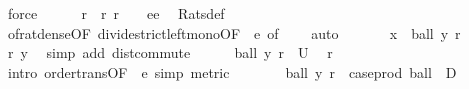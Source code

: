 \begin{isabellebody}
\ force\isanewline
\ \ \ \ \isamarkupfalse%
\ r\ \ r{\isacharcolon}{\kern0pt}\ {\isachardoublequoteopen}r\ {\isasymin}\ {\isasymrat}\ {\isasyminter}\ {\isacharbraceleft}{\kern0pt}e{\isacharslash}{\kern0pt}{}{\isacharless}{\kern0pt}{\isachardot}{\kern0pt}{\isachardot}{\kern0pt}{\isacharless}{\kern0pt}e{\isacharslash}{\kern0pt}{}{\isacharbraceright}{\kern0pt}{\isachardoublequoteclose}\ \isamarkupfalse%
\ Rats{\isacharunderscore}{\kern0pt}def\ \isamarkupfalse%
\ of{\isacharunderscore}{\kern0pt}rat{\isacharunderscore}{\kern0pt}dense{\isacharbrackleft}{\kern0pt}OF\ divide{\isacharunderscore}{\kern0pt}strict{\isacharunderscore}{\kern0pt}left{\isacharunderscore}{\kern0pt}mono{\isacharbrackleft}{\kern0pt}OF\ {\isacharunderscore}{\kern0pt}\ e{\isacharparenleft}{\kern0pt}{}{\isacharparenright}{\kern0pt}{\isacharbrackright}{\kern0pt}{\isacharcomma}{\kern0pt}\ of\ {}\ {}{\isacharbrackright}{\kern0pt}\ \isamarkupfalse%
\ auto\isanewline
\isanewline
\ \ \ \ \isamarkupfalse%
\ {\isacharasterisk}{\kern0pt}{\isacharcolon}{\kern0pt}\ {\isachardoublequoteopen}x\ {\isasymin}\ ball\ y\ r{\isachardoublequoteclose}\ \isamarkupfalse%
\ r\ y\ \isamarkupfalse%
\ {\isacharparenleft}{\kern0pt}simp\ add{\isacharcolon}{\kern0pt}\ dist{\isacharunderscore}{\kern0pt}commute{\isacharparenright}{\kern0pt}\isanewline
\ \ \ \ \isamarkupfalse%
\ {\isachardoublequoteopen}ball\ y\ r\ {\isasymsubseteq}\ U{\isachardoublequoteclose}\ \isamarkupfalse%
\ r\ \isamarkupfalse%
\ {\isacharparenleft}{\kern0pt}intro\ order{\isacharunderscore}{\kern0pt}trans{\isacharbrackleft}{\kern0pt}OF\ {\isacharunderscore}{\kern0pt}\ e{\isacharparenleft}{\kern0pt}{}{\isacharparenright}{\kern0pt}{\isacharbrackright}{\kern0pt}{\isacharcomma}{\kern0pt}\ simp{\isacharcomma}{\kern0pt}\ metric{\isacharparenright}{\kern0pt}\isanewline
\ \ \ \ \isamarkupfalse%
\ \isamarkupfalse%
\ {\isachardoublequoteopen}ball\ y\ r\ {\isasymin}\ {\isacharparenleft}{\kern0pt}case{\isacharunderscore}{\kern0pt}prod\ ball\ {\isacharbackquote}{\kern0pt}\ {\isacharparenleft}{\kern0pt}D\ {\isasymtimes}\ {\isacharparenleft}{\kern0pt}{\isasymrat}\ {\isasyminter}\ {\isacharbraceleft}{\kern0pt}{}{\isacharless}{\kern0pt}{\isachardot}{\kern0pt}{\isachardot}{\kern0pt}{\isacharbraceright}{\kern0pt}{\isacharparenright}{\kern0pt}{\isacharparenright}{\kern0pt}{\isacharparenright}{\kern0pt}{\isachardoublequoteclose}\ \isamarkupfalse%

\end{isabellebody}
